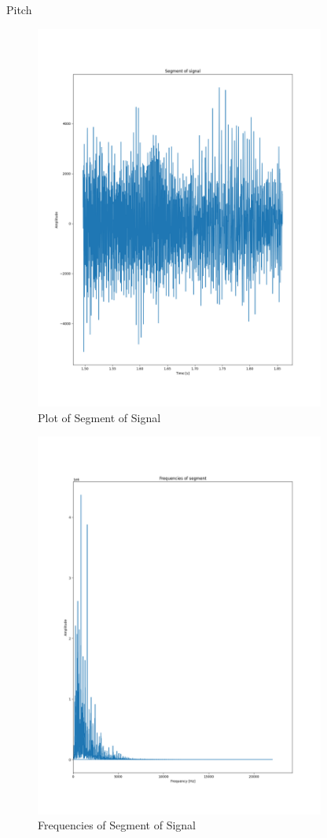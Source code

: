\begin{hwkProblem}{6.2}{Pitch}
	\begin{figure}[ht!]
	  \centering
	  \includegraphics[width=0.85\textwidth]{./6.2.2.png}
	  \caption{Plot of Segment of Signal}
	\end{figure}

	\newpage
	\solpart

	\begin{figure}[ht!]
	  \centering
	  \includegraphics[width=0.85\textwidth]{./6.2.3.png}
	  \caption{Frequencies of Segment of Signal}
	\end{figure}


\end{hwkProblem}
